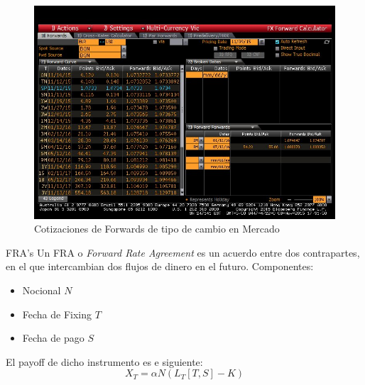 \documentclass[11pt]{beamer}
\begin{document}
\begin{frame}{{}}
	\begin{figure}
		\centering
		\includegraphics[width=0.7\linewidth]{6-eur-frd-screenshot}
		\caption{Cotizaciones de Forwards de tipo de cambio en Mercado}
		\label{fig:6-eur-frd-screenshot}
	\end{figure}
\end{frame}

\begin{frame}{FRA's}
Un FRA o \textit{Forward Rate Agreement} es un acuerdo entre dos contrapartes, en el que intercambian dos flujos de dinero en el futuro.\medskip
Componentes:
\begin{itemize}
	\item Nocional $N$
	\item Fecha de Fixing $T$
	\item Fecha de pago $S$
\end{itemize}
	El payoff de dicho instrumento es e siguiente:
	\begin{equation} \label{payofffra}
	X_T=\alpha N (L_T[T,S]-K)
	\end{equation}
	\begin{center}
		
	\end{center}
\end{frame}
\end{document}
